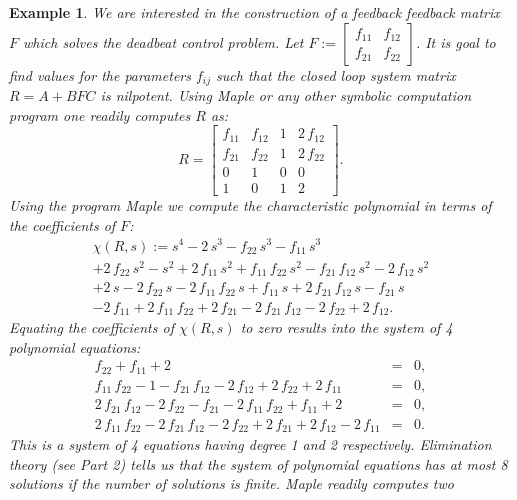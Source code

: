 \documentclass[12pt]{report}
\newtheorem{example}[thm]{Example}
\newenvironment{ex}{\begin{example}\rm}{\end{example}}
\numberwithin{equation}{chapter}
\numberwithin{figure}{chapter}
\begin{document}
\begin{ex}
We are interested in the construction of a feedback 
feedback matrix $F$ which solves the deadbeat control problem. 
Let
$F := \left[ {\begin{array}{cc}
      {f_{11}} & {f_{12}} \\
      {f_{21}} & {f_{22}}
\end{array}}
\right] $.  It is goal to find values for the parameters $f_{ij}$
such that the closed loop system matrix $R=A+BFC$ is
nilpotent. Using Maple or any other symbolic computation program
one readily computes $R$ as: 
$$
R = \left[ {\begin{array}{ccrc}
      {f_{11}} & {f_{12}} & 1 & 2\,{f_{12}} \\
      {f_{21}} & {f_{22}} & 1 & 2\,{f_{22}} \\
      0 & 1 & 0 & 0 \\
      1 & 0 & 1 & 2
\end{array}}
\right] .
$$
Using the program Maple we compute the
characteristic polynomial in terms of the coefficients of $F$:
\begin{multline*}
  \chi(R,s) := s^{4}-2\,s^{3}-{f_{22}}\,s^{3}-{f_{11}}\,s^{3}\\
  +2\,{f_{22}} \,s^{2} - s^{2} + 2\,{f_{11}}\,s^{2} +
  {f_{11}}\,{f_{22}}\,
  s^{2}- {f _{21}}\,{f_{12}}\,s^{2}- 2\,{f_{12}}\,s^{2}\\
  + 2\,s - 2\,{f_{22}}\,s - 2\,{f_{11}}\,{f_{22}}\,s +
  {f_{11}}\,s+ 2\,{f_{21}}\,{f_{12}}\,s - {f_{21}}\,s\\
  - 2\,{f_{11}} + 2\,{f_{11}}\,{f_{22}} + 2\,{f_{21}} -
  2\,{f_{21}}\,{f_{12}} - 2\,{f_{22}} + 2\,{f_{12}}.
\end{multline*}
Equating the coefficients of $\chi(R,s)$ to zero results into the
system of 4 polynomial equations:
$$
\begin{array}{rcl}
  {f_{22}} + {f_{11}} + 2&=&0,  \\
{f_{11}}\,{f_{22}} - 1 - {f_{21}}\,{f_{12}} - 2\,{f_{12}} + 2\,
{f_{22}} + 2\,{f_{11}}&=&0,\\
2\,{f_{21}}\,{f_{12}} - 2\,{f_{22}} - {f_{21}} - 2\,{f_{11}}\,
{f_{22}} + {f_{11}} + 2&=&0,  \\
2\,{f_{11}}\,{f_{22}} - 2\,{f_{21}}\,{f_{12}} - 2\,{f_{22}} + 2\,
{f_{21}} + 2\,{f_{12}} - 2\,{f_{11}}&=&0.
\end{array}
$$
This is a system of 4 equations having degree 1 and 2
respectively. Elimination theory (see Part 2) tells us that the
system of polynomial equations has at most 8 solutions if the
number of solutions is finite.  Maple readily computes two

\end{ex}
\end{document}
